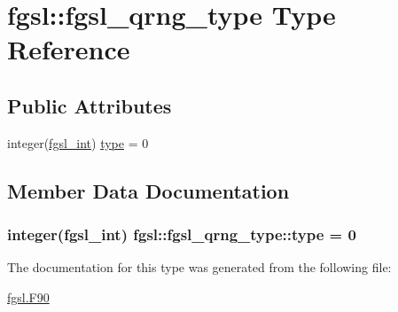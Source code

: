 \hypertarget{structfgsl_1_1fgsl__qrng__type}{\section{fgsl\-:\-:fgsl\-\_\-qrng\-\_\-type Type Reference}
\label{structfgsl_1_1fgsl__qrng__type}
}
\subsection*{Public Attributes}
\begin{DoxyCompactItemize}
\item 
integer(\hyperlink{classfgsl_a222deda1d7a0c0e845ce4a683318efeb}{fgsl\-\_\-int}) \hyperlink{structfgsl_1_1fgsl__qrng__type_a3e0ae09be0c95e66fe6bef740c4d2688}{type} = 0
\end{DoxyCompactItemize}


\subsection{Member Data Documentation}
\hypertarget{structfgsl_1_1fgsl__qrng__type_a3e0ae09be0c95e66fe6bef740c4d2688}{
\subsubsection[{type}]{\setlength{\rightskip}{0pt plus 5cm}integer({\bf fgsl\-\_\-int}) fgsl\-::fgsl\-\_\-qrng\-\_\-type\-::type = 0}}\label{structfgsl_1_1fgsl__qrng__type_a3e0ae09be0c95e66fe6bef740c4d2688}


The documentation for this type was generated from the following file\-:\begin{DoxyCompactItemize}
\item 
\hyperlink{fgsl_8F90}{fgsl.\-F90}\end{DoxyCompactItemize}
